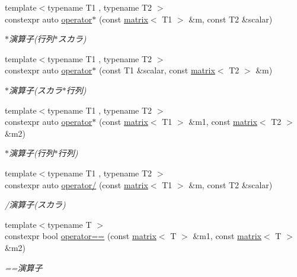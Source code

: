 \begin{DoxyCompactItemize}
{\footnotesize template$<$typename T1 , typename T2 $>$ }\\constexpr auto \mbox{\hyperlink{namespacesaki_a8ec94b07795582554759e6f844b6055f}{operator$\ast$}} (const \mbox{\hyperlink{classsaki_1_1matrix}{matrix}}$<$ T1 $>$ \&m, const T2 \&scalar)
\begin{DoxyCompactList}\small\item\em $\ast$演算子(行列$\ast$スカラ) \end{DoxyCompactList}\item 
{\footnotesize template$<$typename T1 , typename T2 $>$ }\\constexpr auto \mbox{\hyperlink{namespacesaki_acc7d16324180fd378c3636f9bd961d20}{operator$\ast$}} (const T1 \&scalar, const \mbox{\hyperlink{classsaki_1_1matrix}{matrix}}$<$ T2 $>$ \&m)
\begin{DoxyCompactList}\small\item\em $\ast$演算子(スカラ$\ast$行列) \end{DoxyCompactList}\item 
{\footnotesize template$<$typename T1 , typename T2 $>$ }\\constexpr auto \mbox{\hyperlink{namespacesaki_ae7d9d53f473cbaa176e97500ea9ee491}{operator$\ast$}} (const \mbox{\hyperlink{classsaki_1_1matrix}{matrix}}$<$ T1 $>$ \&m1, const \mbox{\hyperlink{classsaki_1_1matrix}{matrix}}$<$ T2 $>$ \&m2)
\begin{DoxyCompactList}\small\item\em $\ast$演算子(行列$\ast$行列) \end{DoxyCompactList}\item 
{\footnotesize template$<$typename T1 , typename T2 $>$ }\\constexpr auto \mbox{\hyperlink{namespacesaki_ac69ad44a115a64e5874921344c34d62e}{operator/}} (const \mbox{\hyperlink{classsaki_1_1matrix}{matrix}}$<$ T1 $>$ \&m, const T2 \&scalar)
\begin{DoxyCompactList}\small\item\em /演算子(スカラ) \end{DoxyCompactList}\item 
{\footnotesize template$<$typename T $>$ }\\constexpr bool \mbox{\hyperlink{namespacesaki_a67e5e15cae6e9152e0bd5ac2e1705da4}{operator==}} (const \mbox{\hyperlink{classsaki_1_1matrix}{matrix}}$<$ T $>$ \&m1, const \mbox{\hyperlink{classsaki_1_1matrix}{matrix}}$<$ T $>$ \&m2)
\begin{DoxyCompactList}\small\item\em ==演算子 \end{DoxyCompactList}\item 

\end{DoxyCompactItemize}
